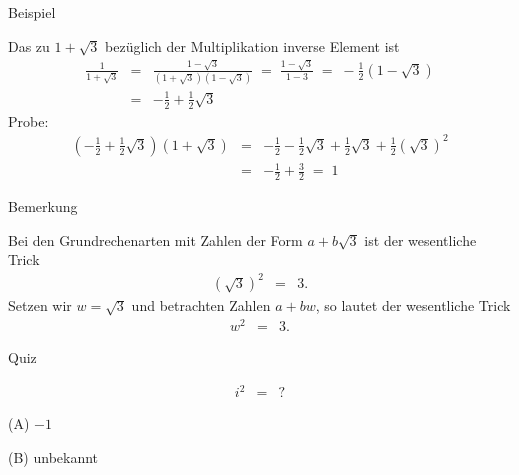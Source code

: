 \documentclass[german]{beamer}
\newcommand{\bq}{\begin{eqnarray*}}
\newcommand{\eq}{\end{eqnarray*}}
\begin{document}
\begin{frame}{Beispiel}

Das zu $1+\sqrt{3}$ bez\"uglich der Multiplikation inverse Element ist
\bq
 \frac{1}{1 + \sqrt{3}}
 & = &
 \frac{1 - \sqrt{3}}{\left(1 + \sqrt{3}\right) \left(1 - \sqrt{3}\right)}
 \; = \;
 \frac{1 - \sqrt{3}}{1 - 3}
 \; = \;
 - \frac{1}{2} \left(1 - \sqrt{3}\right)
 \nonumber \\
 & = &
 - \frac{1}{2} + \frac{1}{2} \sqrt{3}
\eq
Probe:
\bq
 \left( - \frac{1}{2} + \frac{1}{2} \sqrt{3} \right) \left( 1+\sqrt{3} \right) 
 & = &
 - \frac{1}{2} - \frac{1}{2} \sqrt{3} + \frac{1}{2} \sqrt{3} + \frac{1}{2} \left( \sqrt{3} \right)^2 
 \nonumber \\
 & = &
 - \frac{1}{2} + \frac{3}{2}
 \; = \; 
 1
\eq

\end{frame}

\begin{frame}{Bemerkung}

Bei den Grundrechenarten mit Zahlen der Form 
$a+b\sqrt{3}$ ist der wesentliche Trick
\bq
 \left( \sqrt{3} \right)^2
 & = & 3.
\eq
Setzen wir $w=\sqrt{3}$ und betrachten Zahlen $a+bw$, so lautet der wesentliche Trick
\bq
 w^2 & = & 3.
\eq

\end{frame}

\begin{frame}{Quiz}

\bq
 i^2 & = & ?
\eq 
\begin{description}
\item{(A)} $-1$
\item{(B)} unbekannt
\end{description}

\end{frame}


\begin{frame}

\end{frame}
\end{document}
